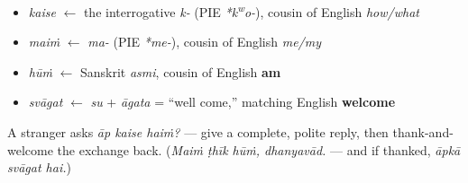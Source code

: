 \begin{grammarlens}[title={What you've built — roots you now carry}]
\begin{itemize}
\raggedright
  \item \emph{kaise} $\leftarrow$ the interrogative \emph{k-} (PIE \emph{*k\textsuperscript{w}o-}), cousin of English \emph{how/what}
  \item \emph{maiṁ} $\leftarrow$ \emph{ma-} (PIE \emph{*me-}), cousin of English \emph{me/my}
  \item \emph{hūṁ} $\leftarrow$ Sanskrit \emph{asmi}, cousin of English \textbf{am}
  \item \emph{svāgat} $\leftarrow$ \emph{su} + \emph{āgata} = \textquotedblleft{}well come,\textquotedblright{} matching English \textbf{welcome}
\end{itemize}
\end{grammarlens}

\begin{tcolorbox}[breakable,colback=teal!4,colframe=teal!35!black,title={Before you move on}]
A stranger asks \emph{āp kaise haiṁ?} — give a complete, polite reply, then thank-and-welcome the exchange back. (\emph{Maiṁ ṭhīk hūṁ, dhanyavād.} — and if thanked, \emph{āpkā svāgat hai.})
\end{tcolorbox}
